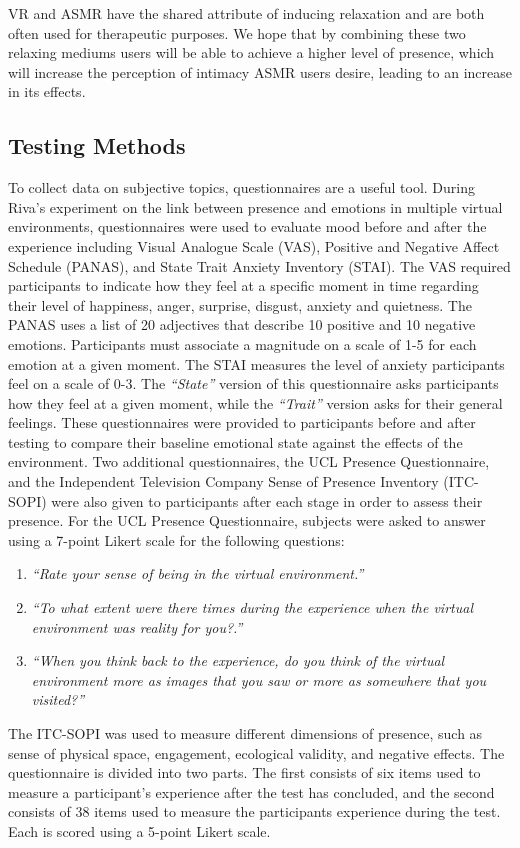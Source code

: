 \documentclass{sigchi}
\newcommand{\inlinequote}[1]{\textit{``#1''}}
\begin{document}
VR and ASMR have the shared attribute of inducing relaxation and are both often used for therapeutic purposes. We hope that by combining these two relaxing mediums users will be able to achieve a higher level of presence, which will increase the perception of intimacy ASMR users desire, leading to an increase in its effects.

\subsection{Testing Methods}
To collect data on subjective topics, questionnaires are a useful tool. During Riva's experiment on the link between presence and emotions in multiple virtual environments, questionnaires were used to evaluate mood before and after the experience including Visual Analogue Scale (VAS), Positive and Negative Affect Schedule (PANAS), and State Trait Anxiety Inventory (STAI). The VAS required participants to indicate how they feel at a specific moment in time regarding their level of happiness, anger, surprise, disgust, anxiety and quietness. The PANAS uses a list of 20 adjectives that describe 10 positive and 10 negative emotions. Participants must associate a magnitude on a scale of 1-5 for each emotion at a given moment. The STAI measures the level of anxiety participants feel on a scale of 0-3. The \inlinequote{State} version of this questionnaire asks participants how they feel at a given moment, while the \inlinequote{Trait} version asks for their general feelings. These questionnaires were provided to participants before and after testing to compare their baseline emotional state against the effects of the environment. Two additional questionnaires, the UCL Presence Questionnaire, and the Independent Television Company Sense of Presence Inventory (ITC-SOPI) were also given to participants after each stage in order to assess their presence. For the UCL Presence Questionnaire, subjects were asked to answer using a 7-point Likert scale for the following questions:
\begin{enumerate}
	\item{\inlinequote{Rate your sense of being in the virtual environment.}}
	\item{\inlinequote{To what extent were there times during the experience when the virtual environment was reality for you?.}}
	\item{\inlinequote{When you think back to the experience, do you think of the virtual environment more as images that you saw or more 	as somewhere that you visited?}}
\end{enumerate}
The ITC-SOPI was used to measure different dimensions of presence, such as sense of physical space, engagement, ecological validity, and negative effects. The questionnaire is divided into two parts. The first consists of six items used to measure a participant's experience after the test has concluded, and the second consists of 38 items used to measure the participants experience during the test. Each is scored using a 5-point Likert scale.
\end{document}
